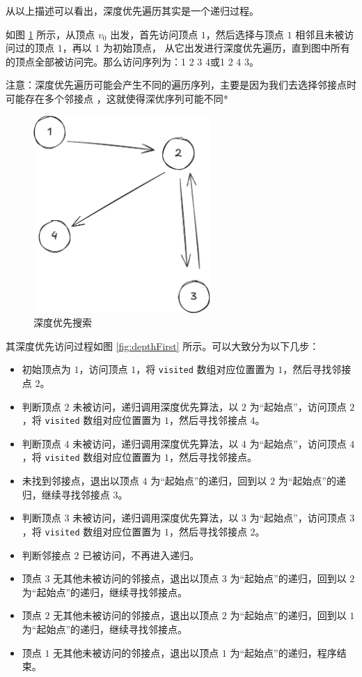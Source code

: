 \documentclass[lang=cn,newtx,10pt,scheme=chinese]{../elegantbook}
\begin{document}
从以上描述可以看出，深度优先遍历其实是一个递归过程。

如图 \ref{fig:DFS} 所示，从顶点 $v_0$ 出发，首先访问顶点 $1$，然后选择与顶点 $1$ 相邻且未被访问过的顶点 $1$，再以 $1$ 为初始顶点，
从它出发进行深度优先遍历，直到图中所有的顶点全部被访问完。那么访问序列为：1 2 3 4或1 2 4 3。

注意：深度优先遍历可能会产生不同的遍历序列，主要是因为我们去选择邻接点时可能存在多个邻接点 ，这就使得深优序列可能不同*

\begin{figure}[h!]
  \centering
  \includegraphics[width=0.6\textwidth]{./figure/pdf/cropped/depthFirstGraph.pdf}
  \caption{深度优先搜索}
  \label{fig:DFS}
\end{figure}

其深度优先访问过程如图 \ref{fig:depthFirst} 所示。可以大致分为以下几步：

\begin{itemize}
  \item 初始顶点为 $1$，访问顶点 $1$，将 \texttt{visited} 数组对应位置置为 $1$，然后寻找邻接点 $2$。  
  \item 判断顶点 $2$ 未被访问，递归调用深度优先算法，以 $2$ 为“起始点”，访问顶点 $2$，将 \texttt{visited} 数组对应位置置为 $1$，然后寻找邻接点 $4$。  
  \item 判断顶点 $4$ 未被访问，递归调用深度优先算法，以 $4$ 为“起始点”，访问顶点 $4$，将 \texttt{visited} 数组对应位置置为 $1$，然后寻找邻接点。  
  \item 未找到邻接点，退出以顶点 $4$ 为“起始点”的递归，回到以 $2$ 为“起始点”的递归，继续寻找邻接点 $3$。  
  \item 判断顶点 $3$ 未被访问，递归调用深度优先算法，以 $3$ 为“起始点”，访问顶点 $3$，将 \texttt{visited} 数组对应位置置为 $1$，然后寻找邻接点 $2$。  
  \item 判断邻接点 $2$ 已被访问，不再进入递归。  
  \item 顶点 $3$ 无其他未被访问的邻接点，退出以顶点 $3$ 为“起始点”的递归，回到以 $2$ 为“起始点”的递归，继续寻找邻接点。  
  \item 顶点 $2$ 无其他未被访问的邻接点，退出以顶点 $2$ 为“起始点”的递归，回到以 $1$ 为“起始点”的递归，继续寻找邻接点。  
  \item 顶点 $1$ 无其他未被访问的邻接点，退出以顶点 $1$ 为“起始点”的递归，程序结束。
\end{itemize}
\end{document}
